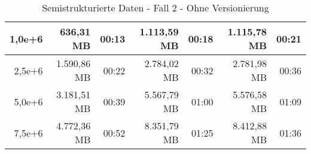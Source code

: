 \begin{table}
\begin{tabular}{|r|r|r|r|r|r|r|}
        1,0e+6          & 636,31 MB           & 00:13           & 1.113,59 MB         & 00:18           & 1.115,78 MB         & 00:21           \\ \hline
        2,5e+6          & 1.590,86 MB         & 00:22           & 2.784,02 MB         & 00:32           & 2.781,98 MB         & 00:36           \\ \hline
        5,0e+6          & 3.181,51 MB         & 00:39           & 5.567,79 MB         & 01:00           & 5.576,58 MB         & 01:09           \\ \hline
        7,5e+6          & 4.772,36 MB         & 00:52           & 8.351,79 MB         & 01:25           & 8.412,88 MB         & 01:36           \\ \hline
    \end{tabular}
    \caption{Semistrukturierte Daten - Fall 2 - Ohne Versionierung}
\end{table}

